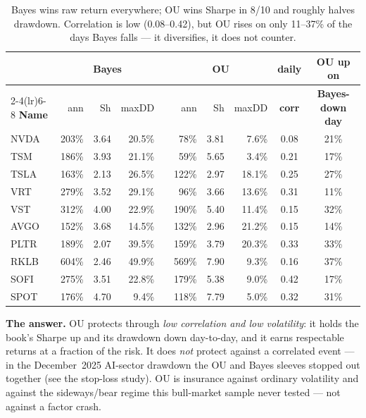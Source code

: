 \documentclass[11pt]{article}
\begin{document}
\begin{table}[h]\centering\small
\renewcommand{\arraystretch}{1.12}
\begin{tabular}{l rrr c rrr c c}
\toprule
& \multicolumn{3}{c}{\textbf{Bayes}} & & \multicolumn{3}{c}{\textbf{OU}} & \textbf{daily} & \textbf{OU up on}\\
\cmidrule(lr){2-4}\cmidrule(lr){6-8}
\textbf{Name} & ann & Sh & maxDD & & ann & Sh & maxDD & \textbf{corr} & \textbf{Bayes-down day}\\
\midrule
NVDA & 203\% & 3.64 & 20.5\% & & 78\%  & 3.81 & 7.6\%  & 0.08 & 21\%\\
TSM  & 186\% & 3.93 & 21.1\% & & 59\%  & 5.65 & 3.4\%  & 0.21 & 17\%\\
TSLA & 163\% & 2.13 & 26.5\% & & 122\% & 2.97 & 18.1\% & 0.25 & 27\%\\
VRT  & 279\% & 3.52 & 29.1\% & & 96\%  & 3.66 & 13.6\% & 0.31 & 11\%\\
VST  & 312\% & 4.00 & 22.9\% & & 190\% & 5.40 & 11.4\% & 0.15 & 32\%\\
AVGO & 152\% & 3.68 & 14.5\% & & 132\% & 2.96 & 21.2\% & 0.15 & 14\%\\
PLTR & 189\% & 2.07 & 39.5\% & & 159\% & 3.79 & 20.3\% & 0.33 & 33\%\\
RKLB & 604\% & 2.46 & 49.9\% & & 569\% & 7.90 & 9.3\%  & 0.16 & 37\%\\
SOFI & 275\% & 3.51 & 22.8\% & & 179\% & 5.38 & 9.0\%  & 0.42 & 17\%\\
SPOT & 176\% & 4.70 & 9.4\%  & & 118\% & 7.79 & 5.0\%  & 0.32 & 31\%\\
\bottomrule
\end{tabular}
\caption*{\footnotesize Bayes wins raw return everywhere; OU wins Sharpe in 8/10 and roughly
halves drawdown. Correlation is low (0.08--0.42), but OU rises on only 11--37\% of the days
Bayes falls --- it diversifies, it does not counter.}
\end{table}

\textbf{The answer.} OU protects through \emph{low correlation and low volatility}: it holds
the book's Sharpe up and its drawdown down day-to-day, and it earns respectable returns at a
fraction of the risk. It does \emph{not} protect against a correlated event --- in the
December~2025 AI-sector drawdown the OU and Bayes sleeves stopped out together (see the
stop-loss study). OU is insurance against ordinary volatility and against the sideways/bear
regime this bull-market sample never tested --- not against a factor crash.
\end{document}
